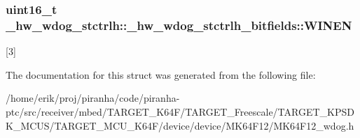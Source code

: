 \subsubsection[{\texorpdfstring{W\+I\+N\+EN}{WINEN}}]{\setlength{\rightskip}{0pt plus 5cm}uint16\+\_\+t \+\_\+hw\+\_\+wdog\+\_\+stctrlh\+::\+\_\+hw\+\_\+wdog\+\_\+stctrlh\+\_\+bitfields\+::\+W\+I\+N\+EN}\hypertarget{struct__hw__wdog__stctrlh_1_1__hw__wdog__stctrlh__bitfields_aba8de54f986116eab099e9520db22ec6}{}\label{struct__hw__wdog__stctrlh_1_1__hw__wdog__stctrlh__bitfields_aba8de54f986116eab099e9520db22ec6}
\mbox{[}3\mbox{]} 

The documentation for this struct was generated from the following file\+:\begin{DoxyCompactItemize}
\item 
/home/erik/proj/piranha/code/piranha-\/ptc/src/receiver/mbed/\+T\+A\+R\+G\+E\+T\+\_\+\+K64\+F/\+T\+A\+R\+G\+E\+T\+\_\+\+Freescale/\+T\+A\+R\+G\+E\+T\+\_\+\+K\+P\+S\+D\+K\+\_\+\+M\+C\+U\+S/\+T\+A\+R\+G\+E\+T\+\_\+\+M\+C\+U\+\_\+\+K64\+F/device/device/\+M\+K64\+F12/M\+K64\+F12\+\_\+wdog.\+h\end{DoxyCompactItemize}
